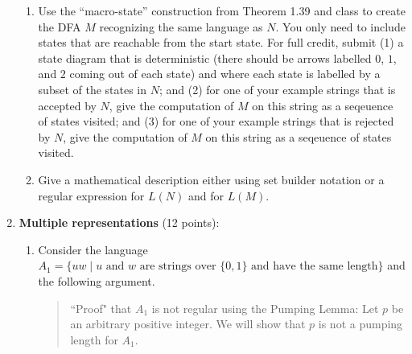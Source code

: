 \begin{enumerate}[wide, labelwidth=!, labelindent=0pt]
\begin{enumerate}
      \item\gradeCorrectFirst Use the ``macro-state'' construction from Theorem 1.39 and class to create the DFA
      $M$ recognizing the same language as $N$. You only need to include states that are reachable from the start
      state. For full credit, submit (1) a state diagram that is deterministic (there should be arrows labelled $0$, $1$, and 
      $2$ coming out of each state) and where each state is labelled by a subset of the states in $N$; 
      and (2) for one of your example strings that is accepted by $N$, give the computation of $M$ on this string as a 
      seqeuence of states visited; and (3) for one of your example strings that is rejected by $N$, 
      give the computation of $M$ on this string as a seqeuence of states visited.

      \item\gradeComplete Give a mathematical description either using set builder notation or a regular expression
      for $L(N)$ and for $L(M)$.
    \end{enumerate}

\item \textbf{Multiple representations} (12 points):

\begin{enumerate}
   \item Consider the language $A_1 = \{ uw \mid \text{$u$ and
   $w$ are strings over $\{0,1\}$ and have the same length} \}$
   and the following argument.

   \begin{quote}
      ``Proof" that $A_1$ is not regular using the Pumping Lemma: Let $p$ be 
      an arbitrary positive integer. We will show that $p$ is not a pumping length for $A_1$. 
      

\end{quote}
\end{enumerate}
\end{enumerate}
